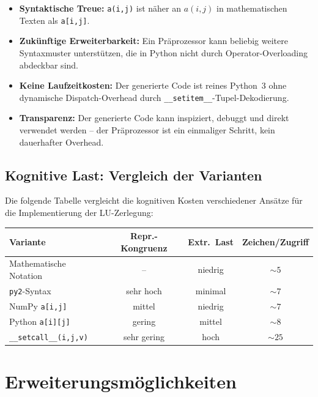 ﻿\documentclass[a4paper,12pt]{article}
\theoremstyle{definition}
\begin{document}
\begin{itemize}
	\item \textbf{Syntaktische Treue:} \texttt{a(i,j)} ist näher an $a(i,j)$ in
	      mathematischen Texten als \texttt{a[i,j]}.
	\item \textbf{Zuk\"unftige Erweiterbarkeit:} Ein Pr\"aprozessor kann beliebig
	      weitere Syntaxmuster unterst\"utzen, die in Python nicht durch
	      Operator-Overloading abdeckbar sind.
	\item \textbf{Keine Laufzeitkosten:} Der generierte Code ist reines Python~3
	      ohne dynamische Dispatch-Overhead durch \texttt{\_\_setitem\_\_}-Tupel-Dekodierung.
	\item \textbf{Transparenz:} Der generierte Code kann inspiziert, debuggt und
	      direkt verwendet werden -- der Pr\"aprozessor ist ein einmaliger Schritt,
	      kein dauerhafter Overhead.
\end{itemize}

\subsection{Kognitive Last: Vergleich der Varianten}

Die folgende Tabelle vergleicht die kognitiven Kosten verschiedener Ans\"atze f\"ur
die Implementierung der LU-Zerlegung:

\begin{center}
\begin{tabular}{lccc}
\toprule
\textbf{Variante} & \textbf{Repr.-Kongruenz} & \textbf{Extr.\ Last} & \textbf{Zeichen/Zugriff} \\
\midrule
Mathematische Notation & -- & niedrig & $\sim 5$ \\
\texttt{py2}-Syntax & sehr hoch & minimal & $\sim 7$ \\
NumPy \texttt{a[i,j]} & mittel & niedrig & $\sim 7$ \\
Python \texttt{a[i][j]} & gering & mittel & $\sim 8$ \\
\texttt{\_\_setcall\_\_(i,j,v)} & sehr gering & hoch & $\sim 25$ \\
\bottomrule
\end{tabular}
\end{center}

\section{Erweiterungsm\"oglichkeiten}
\end{document}
